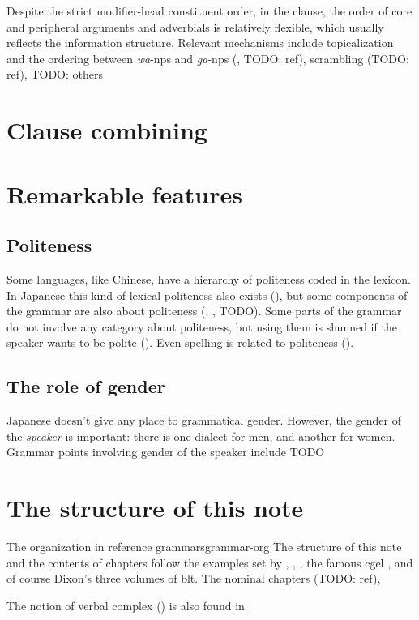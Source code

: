 \documentclass[UTF8, a4paper, oneside, scheme=plain]{ctexrep}
\newcommand{\corpus}[1]{\emph{#1}}
\begin{document}
Despite the strict modifier-head constituent order,
in the clause, the order of core and peripheral arguments and adverbials is relatively flexible,
which usually reflects the information structure.
Relevant mechanisms include 
topicalization and the ordering between \corpus{wa}-\ac{np}s and \corpus{ga}-\ac{np}s 
(, TODO: ref), scrambling (TODO: ref), 
TODO: others

\section{Clause combining}

\section{Remarkable features}

\subsection{Politeness}

Some languages, like Chinese, have a hierarchy of politeness coded in the lexicon.
In Japanese this kind of lexical politeness also exists (),
but some components of the grammar are also about politeness
(, , TODO).
Some parts of the grammar do not involve any category about politeness,
but using them is shunned if the speaker wants to be polite
().
Even spelling is related to politeness ().

\subsection{The role of gender}

Japanese doesn't give any place to grammatical gender.
However, the gender of the \emph{speaker} is important:
there is one dialect for men,
and another for women.
Grammar points involving gender of the speaker include TODO

\section{The structure of this note}

\begin{theorybox}{The organization in reference grammars}{grammar-org}
    The structure of this note and the contents of chapters follow 
    the examples set by \citet{Friesen2017}, \citet{jacques2021grammar}, \citet{Grimm2021},
    the famous \acs{cgel} \citep{cgel}, and of course Dixon's three volumes of \acs{blt}.
    The nominal chapters (TODO: ref), 
    
    The notion of verbal complex () is also found in 
    \citet{Friesen2017}.
\end{theorybox}
\end{document}
